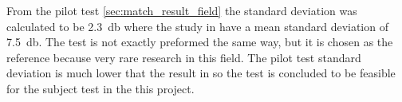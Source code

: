 From the pilot test \autoref{sec:match_result_field} the standard deviation was calculated to be \SI{2.3}{\decibel} where the study in \citep{STENFELT201385} have a mean standard deviation of \SI{7.5}{\decibel}. The test is not exactly preformed the same way, but it is chosen as the reference because very rare research in this field. The pilot test standard deviation is much lower that the result in \citep{STENFELT201385} so the test is concluded to be feasible for the subject test in the this project.

